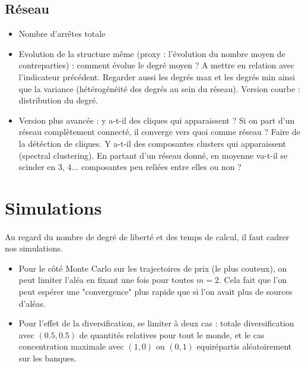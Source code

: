 \documentclass{article}
\begin{document}
\begin{appendices}
\subsection{Réseau}

\begin{itemize}

	\item Nombre d'arrêtes totale
	
	\item Evolution de la structure même (proxy : l'évolution du nombre moyen de contreparties) : comment évolue le degré moyen ? A mettre en relation avec l'indicateur précédent. Regarder aussi les degrés max et les degrés min ainsi que la variance (hétérogénéité des degrés au sein du réseau). Version courbe : distribution du degré. 
	
	\item Version plus avancée : y a-t-il des cliques qui apparaissent ? Si on part d'un réseau complètement connecté, il converge vers quoi comme réseau ? Faire de la détéction de cliques. Y a-t-il des composantes clusters qui apparaissent (spectral clustering). En partant d'un réseau donné, en moyenne va-t-il se scinder en 3, 4... composantes peu reliées entre elles ou non ? 


	
	
\end{itemize}


\section{Simulations}

\paragraph{}
Au regard du nombre de degré de liberté et des temps de calcul, il faut cadrer nos simulations.

\begin{itemize}
    \item Pour le côté Monte Carlo sur les trajectoires de prix (le plus couteux), on peut limiter l'aléa en fixant une fois pour toutes $m=2$. Cela fait que l'on peut espérer une "convergence" plus rapide que si l'on avait plus de sources d'aléas.
    
    \item Pour l'effet de la diversification, se limiter à deux cas : totale diversification avec $(0.5, 0.5)$ de quantités relatives pour tout le monde, et le cas concentration maximale avec $(1, 0)$ ou $(0, 1)$ equirépartis aléatoirement sur les banques. 
    

\end{itemize}
\end{appendices}
\end{document}
